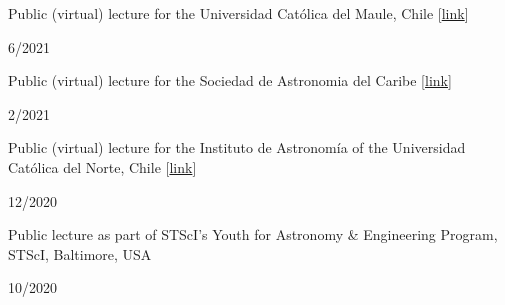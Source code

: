 \documentclass[12pt, a4paper]{article} %
\begin{document}
\vspace{0.2cm}

\begin{minipage}[t]{0.7\textwidth}
\begin{flushleft}%
  \setlength{\leftskip}{0.2cm}%
Public (virtual) lecture for the Universidad Cat\'olica del Maule, Chile [\href{https://www.youtube.com/watch?v=vTd1w5LZnxA&list=PLZzSGxpMedi4A1anthGHRVeT0zMKOcYZo&index=6}{link}]
\end{flushleft}
\end{minipage}
\begin{minipage}[t]{0.3\textwidth}
\hfill 6/2021
\end{minipage}

\vspace{0.2cm}

\begin{minipage}[t]{0.7\textwidth}
\begin{flushleft}%
  \setlength{\leftskip}{0.2cm}%
Public (virtual) lecture for the Sociedad de Astronomia del Caribe [\href{https://www.facebook.com/sociedad.astronomia/videos/179268820227106}{link}]
\end{flushleft}
\end{minipage}
\begin{minipage}[t]{0.3\textwidth}
\hfill 2/2021
\end{minipage}

\vspace{0.2cm}

\begin{minipage}[t]{0.7\textwidth}
\begin{flushleft}%
  \setlength{\leftskip}{0.2cm}%
Public (virtual) lecture for the Instituto de Astronom\'ia of the Universidad Cat\'olica del Norte, Chile [\href{https://fb.watch/2xSnifLOxN/}{link}]
\end{flushleft}
\end{minipage}
\begin{minipage}[t]{0.3\textwidth}
\hfill 12/2020
\end{minipage}

\vspace{0.2cm}

\begin{minipage}[t]{0.7\textwidth}
\begin{flushleft}%
  \setlength{\leftskip}{0.2cm}%
Public lecture as part of STScI’s Youth for Astronomy \& Engineering Program, STScI, Baltimore, USA
\end{flushleft}
\end{minipage}
\begin{minipage}[t]{0.3\textwidth}
\hfill 10/2020
\end{minipage}
\end{document}
